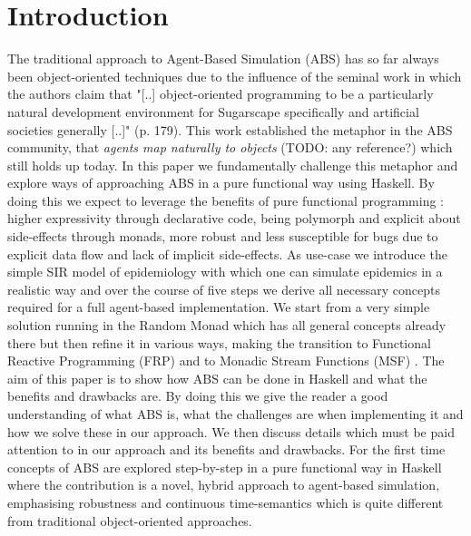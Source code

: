 \section{Introduction}
The traditional approach to Agent-Based Simulation (ABS) has so far always been object-oriented techniques due to the influence of the seminal work \cite{epstein_growing_1996} in which the authors claim that "[..] object-oriented programming to be a particularly natural development environment for Sugarscape specifically and artificial societies generally [..]" (p. 179). This work established the metaphor in the ABS community, that \textit{agents map naturally to objects} (TODO: any reference?) which still holds up today.
In this paper we fundamentally challenge this metaphor and explore ways of approaching ABS in a pure functional way using Haskell. By doing this we expect to leverage the benefits of pure functional programming \cite{hudak_history_2007}: higher expressivity through declarative code, being polymorph and explicit about side-effects through monads, more robust and less susceptible for bugs due to explicit data flow and lack of implicit side-effects.
As use-case we introduce the simple SIR model of epidemiology with which one can simulate epidemics in a realistic way and over the course of five steps we derive all necessary concepts required for a full agent-based implementation. We start from a very simple solution running in the Random Monad which has all general concepts already there but then refine it in various ways, making the transition to Functional Reactive Programming (FRP) \cite{wan_functional_2000} and to Monadic Stream Functions (MSF) \cite{perez_functional_2016}.
The aim of this paper is to show how ABS can be done in Haskell and what the benefits and drawbacks are. By doing this we give the reader a good understanding of what ABS is, what the challenges are when implementing it and how we solve these in our approach. We then discuss details which must be paid attention to in our approach and its benefits and drawbacks. For the first time concepts of ABS are explored step-by-step in a pure functional way in Haskell where the contribution is a novel, hybrid approach to agent-based simulation, emphasising robustness and continuous time-semantics which is quite different from traditional object-oriented approaches.